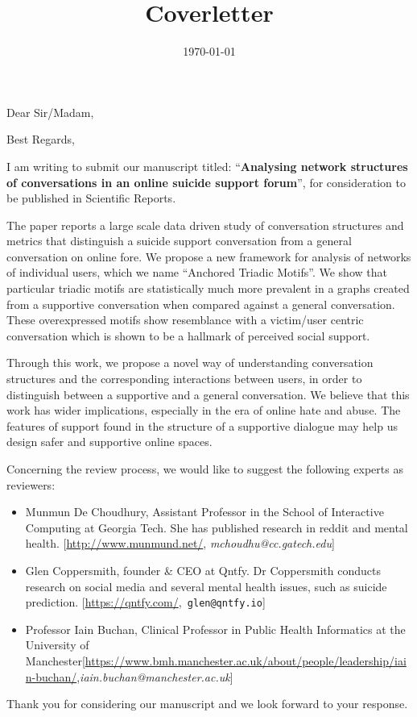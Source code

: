 \documentclass[11pt,a4paper,roman]{moderncv}        %
\title{Coverletter}                               %
\begin{document}
    \date{\today}
    \opening{Dear Sir/Madam,}
    \closing{Best Regards,}
    \makelettertitle
    
    
   I am writing to submit our manuscript titled: ``\textbf{Analysing network structures of conversations in an online suicide support forum}'', for consideration to be published in Scientific Reports.
   
   The paper reports a large scale data driven study of conversation structures and metrics that distinguish a suicide support conversation from a general conversation on online fore. We propose a new framework for analysis of networks of individual users, which we name ``Anchored Triadic Motifs''. We show that particular triadic motifs are statistically much more prevalent in a graphs created from a supportive conversation when compared against a general conversation. These overexpressed motifs show resemblance with a victim/user centric conversation which is shown to be a hallmark of perceived social support.
   
   Through this work, we propose a novel way of understanding conversation structures and the corresponding interactions between users, in order to distinguish between a supportive and a general conversation. 
   We believe that this work has wider implications, especially in the era of online hate and abuse. The features of support found in the structure of a supportive dialogue may help us design safer and supportive online spaces.
  
  
   Concerning the review process, we would like to suggest the following experts as reviewers:
   \begin{itemize}
        \item Munmun De Choudhury, Assistant Professor in the School of Interactive Computing at Georgia Tech. She has published research in reddit and mental health. [\url{http://www.munmund.net/}, \textit{mchoudhu@cc.gatech.edu}]
        \item Glen Coppersmith, founder \& CEO at Qntfy. Dr Coppersmith conducts research on social media and several mental health issues, such as suicide prediction. [\url{https://qntfy.com/},\texttt{ glen@qntfy.io}]
        \item Professor Iain Buchan, Clinical Professor in Public Health Informatics at the University of Manchester[\url{https://www.bmh.manchester.ac.uk/about/people/leadership/iain-buchan/},\textit{iain.buchan@manchester.ac.uk}]
  
    \end{itemize}
  
   Thank you for considering our manuscript and we look forward to your response.
   
   \makeletterclosing
    
\end{document}
